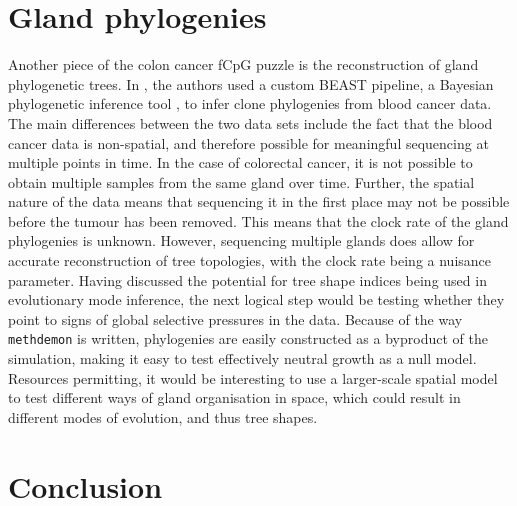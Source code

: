 \section{Gland phylogenies}
Another piece of the colon cancer fCpG puzzle is the reconstruction of gland
phylogenetic trees. In \cite{gabbutt_evolutionary_2023}, the authors used a
custom BEAST pipeline, a Bayesian phylogenetic inference tool
\cite{bouckaert_beast_2019}, to infer clone phylogenies from blood cancer data.
The main differences between the two data sets include the fact that the blood
cancer data is non-spatial, and therefore possible for meaningful sequencing at
multiple points in time. In the case of colorectal cancer, it is not possible
to obtain multiple samples from the same gland over time. Further, the spatial
nature of the data means that sequencing it in the first place may not be
possible before the tumour has been removed. This means that the clock rate of
the gland phylogenies is unknown. However, sequencing multiple glands does
allow for accurate reconstruction of tree topologies, with the clock rate being
a nuisance parameter. Having discussed the potential for tree shape indices
being used in evolutionary mode inference, the next logical step would be
testing whether they point to signs of global selective pressures in the data.
Because of the way \texttt{methdemon} is written, phylogenies are easily
constructed as a byproduct of the simulation, making it easy to test
effectively neutral growth as a null model. Resources permitting, it would be
interesting to use a larger-scale spatial model to test different ways of gland
organisation in space, which could result in different modes of evolution, and
thus tree shapes.

\section{Conclusion}
